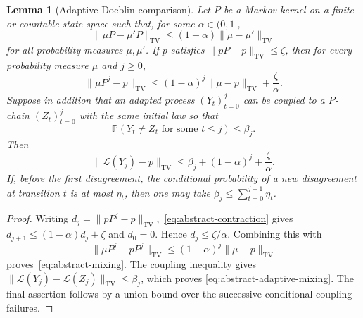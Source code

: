 \documentclass[11pt]{article}
\newcommand{\Pp}{\mathbb P}
\newcommand{\1}{\mathbf 1}
\newcommand{\TV}{\mathrm{TV}}
\newcommand{\cL}{\mathcal L}
\newtheorem{lemma}[theorem]{Lemma}
\theoremstyle{definition}
\theoremstyle{remark}
\begin{document}
\begin{lemma}[Adaptive Doeblin comparison]
\label{lem:adaptive-doeblin}
Let $P$ be a Markov kernel on a finite or countable state space such that,
for some $\alpha\in(0,1]$,
\begin{equation}\label{eq:abstract-contraction}
 \|\mu P-\mu'P\|_{\TV}
 \leq(1-\alpha)\|\mu-\mu'\|_{\TV}
\end{equation}
for all probability measures $\mu,\mu'$.  If $p$ satisfies
$\|pP-p\|_{\TV}\leq\zeta$, then for every probability measure $\mu$ and
$j\geq0$,
\begin{equation}\label{eq:abstract-mixing}
 \|\mu P^j-p\|_{\TV}
 \leq (1-\alpha)^j\|\mu-p\|_{\TV}+\frac{\zeta}{\alpha}.
\end{equation}
Suppose in addition that an adapted process $(Y_t)_{t=0}^j$ can be
coupled to a $P$-chain $(Z_t)_{t=0}^j$ with the same initial law so that
\[
 \Pp(Y_t\ne Z_t\text{ for some }t\leq j)\leq\beta_j.
\]
Then
\begin{equation}\label{eq:abstract-adaptive-mixing}
 \|\cL(Y_j)-p\|_{\TV}
 \leq\beta_j+(1-\alpha)^j+\frac{\zeta}{\alpha}.
\end{equation}
If, before the first disagreement, the conditional probability of a new
disagreement at transition $t$ is at most $\eta_t$, then one may take
$\beta_j\leq\sum_{t=0}^{j-1}\eta_t$.
\end{lemma}

\begin{proof}
Writing $d_j=\|pP^j-p\|_{\TV}$,~\eqref{eq:abstract-contraction} gives
$d_{j+1}\leq(1-\alpha)d_j+\zeta$ and $d_0=0$.  Hence
$d_j\leq\zeta/\alpha$.  Combining this with
\[
 \|\mu P^j-pP^j\|_{\TV}
 \leq(1-\alpha)^j\|\mu-p\|_{\TV}
\]
proves~\eqref{eq:abstract-mixing}.  The coupling inequality gives
$\|\cL(Y_j)-\cL(Z_j)\|_{\TV}\leq\beta_j$, which proves
\eqref{eq:abstract-adaptive-mixing}.  The final assertion follows by a
union bound over the successive conditional coupling failures.
\end{proof}
\end{document}

